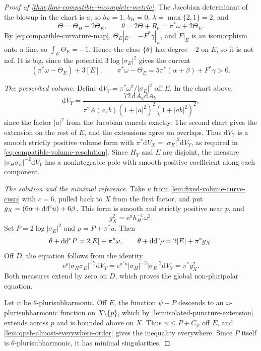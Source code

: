 \begin{proof}[Proof of \cref{thm:flow-compatible-incomplete-metric}]
The Jacobian determinant of the blowup in the chart is $a$, so $b_E=1$, $b_H=0$, $\lambda=\max\{2,1\}=2$, and
\begin{equation}\label{eq:compatible-auxiliary-background}
 \Theta=\Theta_H+2\Theta_E,\qquad
 \theta=2\Theta+R_0=\pi^*\omega+2\Theta_E.
\end{equation}
By \eqref{eq:compatible-curvature-map}, $\Theta_E|_E=-F^*\gamma|_E$, and $F|_E$ is an isomorphism onto a line, so $\int_E\Theta_E=-1$. Hence the class $\{\theta\}$ has degree $-2$ on $E$, so it is not nef. It is big, since the potential $3\log|\sigma_E|^2$ gives the current
\[
 (\pi^*\omega-\Theta_E)+3[E],\qquad
 \pi^*\omega-\Theta_E=5\pi^*(\alpha+\beta)+F^*\gamma>0.
\]

\emph{The prescribed volume.}
Define $\mathrm{d}V_Y=\pi^*\omega^2/|\sigma_E|^2$ off $E$. In the chart above,
\[
 \mathrm{d}V_Y=\frac{72\,\mathrm{d}A_a\mathrm{d}A_b}
 {\pi^2A(a,b)(1+|a|^2)^2(1+|ab|^2)^2},
\]
since the factor $|a|^2$ from the Jacobian cancels exactly. The second chart gives the extension on the rest of $E$, and the extensions agree on overlaps. Thus $\mathrm{d}V_Y$ is a smooth strictly positive volume form with $\pi^*\mathrm{d}V_X=|\sigma_E|^2\mathrm{d}V_Y$, as required in \eqref{eq:compatible-volume-resolution}. Since $H_Y$ and $E$ are disjoint, the measure $|\sigma_H\sigma_E|^{-2}\mathrm{d}V_Y$ has a nonintegrable pole with smooth positive coefficient along each component.

\emph{The solution and the minimal reference.}
Take $u$ from \cref{lem:fixed-volume-curve-cusp} with $c=6$, pulled back to $X$ from the first factor, and put $g_X=(6\alpha+\mathrm{dd}^{\mathrm{c}} u)+6\beta$. This form is smooth and strictly positive near $p$, and
\[
 g_X^2=\mathrm{e}^{u}h_H^{-1}\omega^2.
\]
Set $P=2\log|\sigma_E|^2$ and $\rho=P+\pi^*u$. Then
\[
 \theta+\mathrm{dd}^{\mathrm{c}} P=2[E]+\pi^*\omega,\qquad
 \theta+\mathrm{dd}^{\mathrm{c}}\rho=2[E]+\pi^*g_X.
\]
Off $D$, the equation follows from the identity
\[
 \mathrm{e}^{\rho}|\sigma_H\sigma_E|^{-2}\mathrm{d}V_Y
 =\mathrm{e}^{\pi^*u}|\sigma_H|^{-2}|\sigma_E|^2\mathrm{d}V_Y
 =\pi^*g_X^2.
\]
Both measures extend by zero on $D$, which proves the global non-pluripolar equation.

Let $\psi$ be $\theta$-plurisubharmonic. Off $E$, the function $\psi-P$ descends to an $\omega$-plurisubharmonic function on $X\setminus\{p\}$, which by \cref{lem:isolated-puncture-extension} extends across $p$ and is bounded above on $X$. Thus $\psi\leq P+C_\psi$ off $E$, and \cref{lem:qpsh-almost-everywhere-order} gives the inequality everywhere. Since $P$ itself is $\theta$-plurisubharmonic, it has minimal singularities.


\end{proof}
